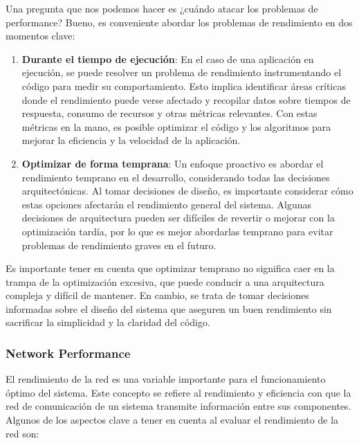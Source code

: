 \documentclass{article}
\begin{document}
		 Una pregunta que nos podemos hacer es ¿cuándo atacar los problemas de performance? Bueno, es conveniente abordar los problemas de rendimiento en dos momentos clave:
		 
		 \begin{enumerate}
		 	\item \textbf{Durante el tiempo de ejecución}: En el caso de una aplicación en ejecución, se puede resolver un problema de rendimiento instrumentando el código para medir su comportamiento. Esto implica identificar áreas críticas donde el rendimiento puede verse afectado y recopilar datos sobre tiempos de respuesta, consumo de recursos y otras métricas relevantes. Con estas métricas en la mano, es posible optimizar el código y los algoritmos para mejorar la eficiencia y la velocidad de la aplicación.
		 	
		 	\item \textbf{Optimizar de forma temprana}: Un enfoque proactivo es abordar el rendimiento temprano en el desarrollo, considerando todas las decisiones arquitectónicas. Al tomar decisiones de diseño, es importante considerar cómo estas opciones afectarán el rendimiento general del sistema. Algunas decisiones de arquitectura pueden ser difíciles de revertir o mejorar con la optimización tardía, por lo que es mejor abordarlas temprano para evitar problemas de rendimiento graves en el futuro.				 	
		 \end{enumerate}
		 
		 Es importante tener en cuenta que optimizar temprano no significa caer en la trampa de la optimización excesiva, que puede conducir a una arquitectura compleja y difícil de mantener. En cambio, se trata de tomar decisiones informadas sobre el diseño del sistema que aseguren un buen rendimiento sin sacrificar la simplicidad y la claridad del código.
		 
 		\subsubsection{Network Performance}
 		El rendimiento de la red es una variable importante para el funcionamiento óptimo del sistema. Este concepto se refiere al rendimiento y eficiencia con que la red de comunicación de un sistema transmite información entre sus componentes. Algunos de los aspectos clave a tener en cuenta al evaluar el rendimiento de la red son:
 		
\end{document}
